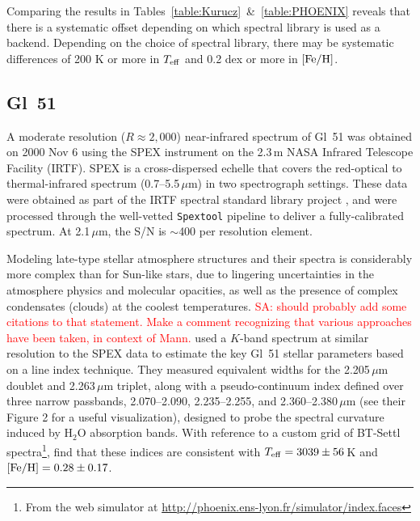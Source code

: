 \documentclass[iop,floatfix]{emulateapj}
\newcommand{\Z}{[{\rm Fe}/{\rm H}]}
\newcommand{\comm}[1]{ \textcolor{red}{SA: #1}}
\begin{document}
Comparing the results in Tables~\ref{table:Kurucz}~\&~\ref{table:PHOENIX} reveals that there is a systematic offset depending on which spectral library is used as a backend. Depending on the choice of spectral library, there may be systematic differences of 200 K or more in $T_{\rm eff}$ and 0.2 dex or more in $\Z$.


\subsection{Gl~51}

A moderate resolution ($R\approx2,000$) near-infrared spectrum of Gl~51 was obtained on 2000 
Nov 6 using the SPEX instrument \citep{rayner03} on the 2.3\,m NASA Infrared Telescope Facility 
(IRTF).  SPEX is a cross-dispersed echelle that covers the red-optical to thermal-infrared spectrum 
(0.7--5.5\,$\mu$m) in two spectrograph settings.  These data were obtained as part of the IRTF 
spectral standard library project \citep{cushing05,rayner09}, and were processed through the 
well-vetted {\tt Spextool} pipeline \citep{cushing04,vacca03} to deliver a fully-calibrated 
spectrum.  At 2.1\,$\mu$m, the S/N is $\sim$400 per resolution element.

Modeling late-type stellar atmosphere structures and their spectra is considerably more complex 
than for Sun-like stars, due to lingering uncertainties in the atmosphere physics and molecular 
opacities, as well as the presence of complex condensates (clouds) at the coolest temperatures.  
\comm{should probably add some citations to that statement.  Make a comment recognizing that 
various approaches have been taken, in context of Mann.}  \citet{rojas-ayala12} used a $K$-band 
spectrum at similar resolution to the SPEX data to estimate the key Gl~51 stellar parameters based 
on a line index technique.  They measured equivalent widths for the 2.205\,$\mu$m  
doublet and 2.263\,$\mu$m  triplet, along with a pseudo-continuum index defined over 
three narrow passbands, 2.070--2.090, 2.235--2.255, and 2.360--2.380\,$\mu$m (see their Figure 2 
for a useful visualization), designed to probe the spectral curvature induced by H$_2$O absorption 
bands.  With reference to a custom grid of {\sc BT-Settl} spectra\footnote{From the web simulator at \url{http://phoenix.ens-lyon.fr/simulator/index.faces}}, \citet{rojas-ayala12} find that 
these indices are consistent with $T_{\rm eff} = 3039\pm56$\,K and $[{\rm Fe/H}] = 0.28\pm0.17$.  
\end{document}
